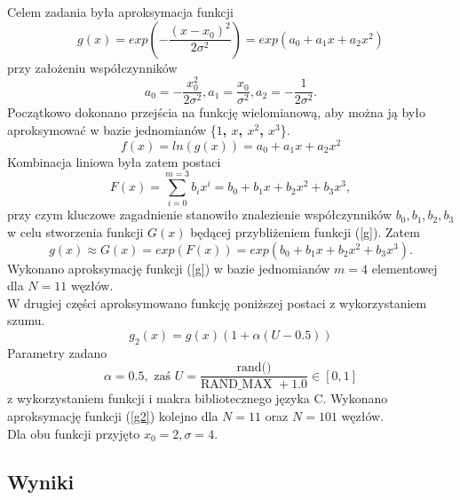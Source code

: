 Celem zadania była aproksymacja funkcji
\begin{equation}
g(x) = exp\left(-\frac{(x - x_0)^2}{2\sigma^2}\right) = exp(a_0+a_1x+a_2x^2)
\label{g}
\end{equation}
przy założeniu współczynników
\begin{equation}
a_0 = -\frac{x_0^2}{2\sigma^2}, a_1 = \frac{x_0}{\sigma^2}, a_2 = -\frac{1}{2\sigma^2}.
\end{equation}
Początkowo dokonano przejścia na funkcję wielomianową, aby można ją było aproksymować w bazie jednomianów \{\textbf{$ 1$, $x$, $x^2$, $x^3$}\}.
\begin{equation}
f(x) = ln(g(x)) = a_0+a_1x+a_2x^2
\label{fx}
\end{equation}
Kombinacja liniowa była zatem postaci 
\begin{equation}
F(x) = \sum_{i=0}^{m=3}b_ix^i = b_0+b_1x+b_2x^2+b_3x^3,
\label{Fx}
\end{equation}
przy czym kluczowe zagadnienie stanowiło znalezienie współczynników $ b_0, b_1,b_2,b_3$ w celu stworzenia funkcji $G(x)$ będącej przybliżeniem funkcji (\ref{g}). Zatem
\begin{equation}
g(x) \approx G(x) = exp(F(x)) = exp(b_0+b_1x+b_2x^2+b_3x^3).
\end{equation}
Wykonano aproksymację funkcji (\ref{g}) w bazie jednomianów $ m = 4 $ elementowej dla $ N = 11 $ węzłów.\\

W drugiej części aproksymowano funkcję poniższej postaci z wykorzystaniem szumu.
\begin{equation}
g_2(x) = g(x)(1 + \alpha(U - 0.5))
\label{g2}
\end{equation}
Parametry zadano
\begin{equation}
\alpha = 0.5, \text{ zaś } U = \frac{\text{rand()}}{\text{RAND\_MAX } + 1.0} \in [0,1]
\end{equation} z wykorzystaniem funkcji i makra bibliotecznego języka C. Wykonano aproksymację funkcji (\ref{g2}) kolejno dla $ N = 11 $ oraz $ N = 101 $ węzłów.\\

Dla obu funkcji przyjęto $ x_0 = 2,\sigma = 4 $.

\newpage
\subsection{Wyniki}

